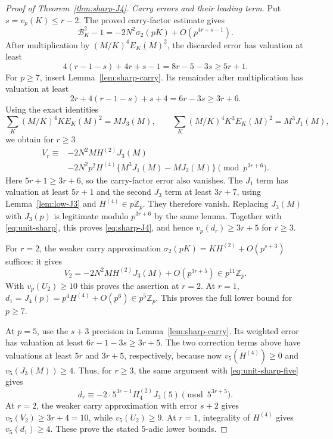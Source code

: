 \documentclass[11pt]{amsart}
\theoremstyle{definition}
\theoremstyle{remark}
\begin{document}
\begin{proof}[Proof of Theorem~\ref{thm:sharp-J4}]
\emph{Carry errors and their leading term.}
Put $s=v_p(K)\le r-2$. The proved carry-factor estimate gives
\[
\mathcal B_K^2-1=-2N^2\sigma_2(pK)+O(p^{4r+s-1}).
\]
After multiplication by $(M/K)^4E_K(M)^2$, the discarded error
has valuation at least
\[
4(r-1-s)+4r+s-1=8r-5-3s\ge5r+1.
\]
For $p\ge7$, insert Lemma~\ref{lem:sharp-carry}.
Its remainder after multiplication has valuation at least
\[
2r+4(r-1-s)+s+4=6r-3s\ge3r+6.
\]
Using the exact identities
\[
\sum_K(M/K)^4K E_K(M)^2=MJ_3(M),\qquad
\sum_K(M/K)^4K^3E_K(M)^2=M^3J_1(M),
\]
we obtain for $r\ge3$
\begin{align*}
V_r\equiv{}&-2N^2M H^{(2)}J_3(M)\\
&-2N^2p^2H^{(4)}\{M^3J_1(M)-MJ_3(M)\}
\pmod{p^{3r+6}}.
\end{align*}
Here $5r+1\ge3r+6$, so the carry-factor error also vanishes.
The $J_1$ term has valuation at least $5r+1$ and the second $J_3$
term at least $3r+7$, using Lemma~\ref{lem:low-J3} and
$H^{(4)}\in p\mathbb Z_p$. They therefore vanish. Replacing
$J_3(M)$ with $J_3(p)$ is legitimate modulo $p^{3r+6}$ by the
same lemma. Together with \eqref{eq:unit-sharp}, this proves
\eqref{eq:sharp-J4}, and hence $v_p(d_r)\ge3r+5$ for $r\ge3$.

For $r=2$, the weaker carry approximation
$\sigma_2(pK)=KH^{(2)}+O(p^{s+3})$ suffices: it gives
\[
V_2=-2N^2M H^{(2)}J_3(M)+O(p^{3r+5})\in p^{11}\mathbb Z_p.
\]
With $v_p(U_2)\ge10$ this proves the assertion at $r=2$.
At $r=1$, $d_1=J_4(p)=p^4H^{(4)}+O(p^6)\in p^5\mathbb Z_p$.
This proves the full lower bound for $p\ge7$.

At $p=5$, use the $s+3$ precision in
Lemma~\ref{lem:sharp-carry}. Its weighted error has valuation at least
$6r-1-3s\ge3r+5$. The two correction terms above have valuations
at least $5r$ and $3r+5$, respectively, because now
$v_5(H^{(4)})\ge0$ and $v_5(J_3(M))\ge4$.
Thus, for $r\ge3$, the same argument with
\eqref{eq:unit-sharp-five} gives
\begin{equation}\label{eq:sharp-five}
d_r\equiv-2\cdot5^{3r-1}H_4^{(2)}J_3(5)
 \pmod{5^{3r+5}}.
\end{equation}
At $r=2$, the weaker carry approximation with error $s+2$ gives
$v_5(V_2)\ge3r+4=10$, while $v_5(U_2)\ge9$.
At $r=1$, integrality of $H^{(4)}$ gives $v_5(d_1)\ge4$.
These prove the stated $5$-adic lower bounds.


\end{proof}
\end{document}
